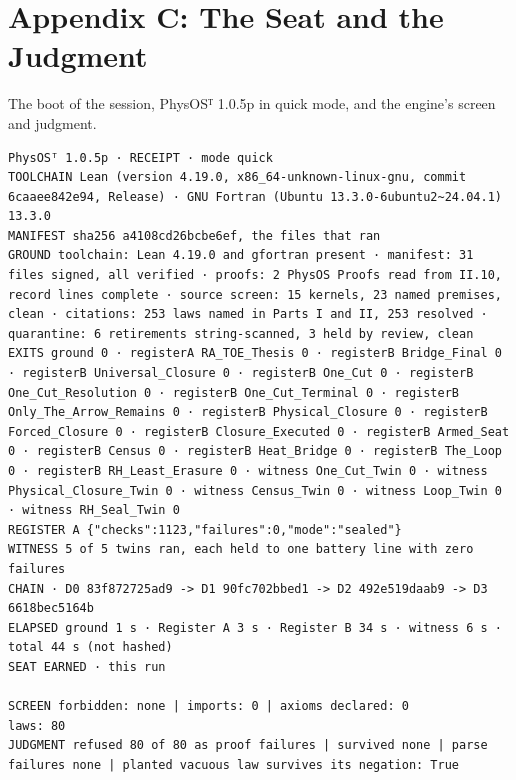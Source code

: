 \documentclass[10pt]{article}
\begin{document}
\hypertarget{appendix-c-the-seat-and-the-judgment}{%
\section{Appendix C: The Seat and the
Judgment}\label{appendix-c-the-seat-and-the-judgment}}

The boot of the session, PhysOSᵀ 1.0.5p in quick mode, and the engine's
screen and judgment.

\begin{Verbatim}[fontsize=\fontsize{6.0}{7.0}\selectfont,breaklines,breakanywhere,breaksymbolleft={}]
PhysOSᵀ 1.0.5p · RECEIPT · mode quick
TOOLCHAIN Lean (version 4.19.0, x86_64-unknown-linux-gnu, commit 6caaee842e94, Release) · GNU Fortran (Ubuntu 13.3.0-6ubuntu2~24.04.1) 13.3.0
MANIFEST sha256 a4108cd26bcbe6ef, the files that ran
GROUND toolchain: Lean 4.19.0 and gfortran present · manifest: 31 files signed, all verified · proofs: 2 PhysOS Proofs read from II.10, record lines complete · source screen: 15 kernels, 23 named premises, clean · citations: 253 laws named in Parts I and II, 253 resolved · quarantine: 6 retirements string-scanned, 3 held by review, clean
EXITS ground 0 · registerA RA_TOE_Thesis 0 · registerB Bridge_Final 0 · registerB Universal_Closure 0 · registerB One_Cut 0 · registerB One_Cut_Resolution 0 · registerB One_Cut_Terminal 0 · registerB Only_The_Arrow_Remains 0 · registerB Physical_Closure 0 · registerB Forced_Closure 0 · registerB Closure_Executed 0 · registerB Armed_Seat 0 · registerB Census 0 · registerB Heat_Bridge 0 · registerB The_Loop 0 · registerB RH_Least_Erasure 0 · witness One_Cut_Twin 0 · witness Physical_Closure_Twin 0 · witness Census_Twin 0 · witness Loop_Twin 0 · witness RH_Seal_Twin 0
REGISTER A {"checks":1123,"failures":0,"mode":"sealed"}
WITNESS 5 of 5 twins ran, each held to one battery line with zero failures
CHAIN · D0 83f872725ad9 -> D1 90fc702bbed1 -> D2 492e519daab9 -> D3 6618bec5164b
ELAPSED ground 1 s · Register A 3 s · Register B 34 s · witness 6 s · total 44 s (not hashed)
SEAT EARNED · this run

SCREEN forbidden: none | imports: 0 | axioms declared: 0
laws: 80
JUDGMENT refused 80 of 80 as proof failures | survived none | parse failures none | planted vacuous law survives its negation: True
\end{Verbatim}
\end{document}
